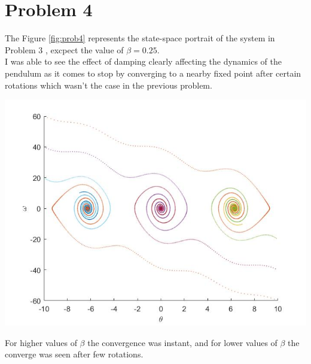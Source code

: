 \documentclass{article}
\begin{document}
\section*{Problem 4}
The Figure \ref{fig:prob4} represents the state-space portrait of the system in Problem 3 , excpect the value of $\beta = 0.25$. \\I was able to see the effect of damping clearly affecting the dynamics of the pendulum as it comes to stop by converging to a nearby fixed point after certain rotations which wasn't the case in the previous problem.\par\bigskip
\begin{minipage}{\linewidth}
{
\centering 
\includegraphics[scale=0.4]{images/prob4.jpg}
\label{fig:prob4}
}
\end{minipage}
\par\bigskip
For higher values of $\beta$ the convergence was instant, and for lower values of $\beta$ the converge was seen after few rotations.
\newpage
\end{document}
